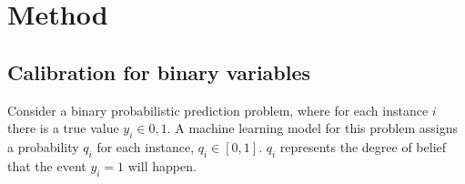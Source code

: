 \chapter{Method}
\section{Calibration for binary variables}

Consider a binary probabilistic prediction problem, where for each instance $i$ there is a true value $y_i \in {0, 1}$. A machine learning model for this problem assigns a probability $q_i$ for each instance, $q_i \in [0, 1]$. $q_i$ represents the degree of belief that the event $y_i = 1$ will happen. 

